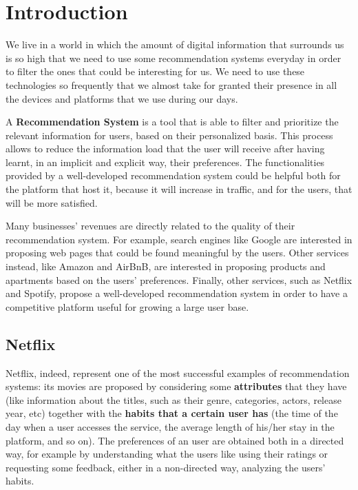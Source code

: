 \section{Introduction}

We live in a world in which the amount of digital information that surrounds us is so high that we need to use some recommendation systems everyday in order to filter the ones that could be interesting for us. We need to use these technologies so frequently that we almost take for granted their presence in all the devices and platforms that we use during our days.\cite{commons-Importance}

A \textbf{Recommendation System} is a tool that is able to filter and prioritize the relevant information for users, based on their personalized basis. This process allows to reduce the information load that the user will receive after having learnt, in an implicit and explicit way, their preferences.\cite{Raghuwanshi-Intro} The functionalities provided by a well-developed recommendation system could be helpful both for the platform that host it, because it will increase in traffic, and for the users, that will be more satisfied.\cite{Ilyas-Intro}

Many businesses' revenues are directly related to the quality of their recommendation system. For example, search engines like Google are interested in proposing web pages that could be found meaningful by the users. Other services instead, like Amazon and AirBnB, are interested in proposing products and apartments based on the users' preferences. Finally, other services, such as Netflix and Spotify, propose a well-developed recommendation system in order to have a competitive platform useful for growing a large user base.

\subsection{Netflix}
Netflix, indeed, represent one of the most successful examples of recommendation systems: its movies are proposed by considering some \textbf{attributes} that they have (like information about the titles, such as their genre, categories, actors, release year, etc) together with the \textbf{habits that a certain user has} (the time of the day when a user accesses the service, the average length of his/her stay in the platform, and so on). The preferences of an user are obtained both in a directed way, for example by understanding what the users like using their ratings or requesting some feedback, either in a non-directed way, analyzing the users' habits.\cite{Netflix-Recommendation} 

